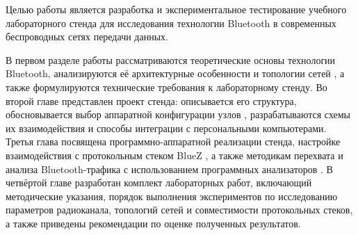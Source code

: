 Целью работы является разработка и экспериментальное тестирование учебного лабораторного стенда для исследования технологии Bluetooth в современных беспроводных сетях передачи данных.

В первом разделе работы рассматриваются теоретические основы технологии Bluetooth, анализируются её архитектурные особенности и топологии сетей \cite{bluetooth_core53, bluetooth_mesh_spec}, а также формулируются технические требования к лабораторному стенду. Во второй главе представлен проект стенда: описывается его структура, обосновывается выбор аппаратной конфигурации узлов \cite{esp32_bt, adventure_esp32, esp32_arduino_configuration}, разрабатываются схемы их взаимодействия и способы интеграции с персональными компьютерами. Третья глава посвящена программно-аппаратной реализации стенда, настройке взаимодействия с протокольным стеком BlueZ \cite{bluez_stack, korbet_linux_net}, а также методикам перехвата и анализа Bluetooth-трафика с использованием программных анализаторов \cite{wireshark_bt_doc, wireshark_setup, btmon_docs}. В четвёртой главе разработан комплект лабораторных работ, включающий методические указания, порядок выполнения экспериментов по исследованию параметров радиоканала, топологий сетей и совместимости протокольных стеков, а также приведены рекомендации по оценке полученных результатов.
